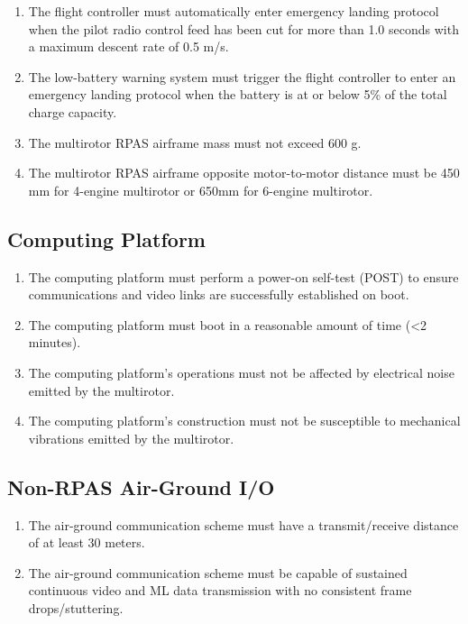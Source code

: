 \documentclass[10pt,letterpaper]{article}
\begin{document}
\begin{enumerate}[label=NF.DR.\arabic*, wide=1cm, widest=3cm, leftmargin=*, font=\bfseries, noitemsep,topsep=0pt, parsep=4pt, partopsep=0pt]
	\item The flight controller must automatically enter emergency landing protocol when the pilot radio control feed has been cut for more than 1.0 seconds with a maximum descent rate of 0.5 m/s.
	\item The low-battery warning system must trigger the flight controller to enter an emergency landing protocol when the battery is at or below 5\% of the total charge capacity.
	\item The multirotor RPAS airframe mass must not exceed 600 g.
	\item The multirotor RPAS airframe opposite motor-to-motor distance must be 450 mm for 4-engine multirotor or 650mm for 6-engine multirotor.
\end{enumerate}

\subsection{Computing Platform}
\begin{enumerate}[label=NF.CP.\arabic*, wide=1cm, widest=3cm, leftmargin=*, font=\bfseries, noitemsep,topsep=0pt, parsep=4pt, partopsep=0pt]
	\item The computing platform must perform a power-on self-test (POST) to ensure communications and video links are successfully established on boot.
	\item The computing platform must boot in a reasonable amount of time (<2 minutes).
	\item The computing platform's operations must not be affected by electrical noise emitted by the multirotor.	
	\item The computing platform's construction must not be susceptible to mechanical vibrations emitted by the multirotor.	
\end{enumerate}

\subsection{Non-RPAS Air-Ground I/O}
\begin{enumerate}[label=NF.CM.\arabic*, wide=1cm, widest=3cm, leftmargin=*, font=\bfseries, noitemsep,topsep=0pt, parsep=4pt, partopsep=0pt]
	\item The air-ground communication scheme must have a transmit/receive distance of at least 30 meters.
	\item The air-ground communication scheme must be capable of sustained continuous video and ML data transmission with no consistent frame drops/stuttering.
\end{enumerate}
\end{document}
